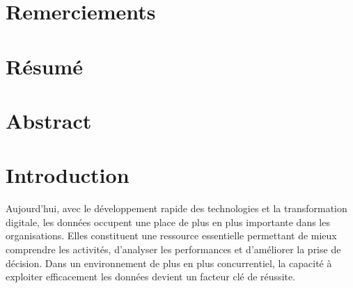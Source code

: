 \documentclass[12pt,a4paper]{report}
\begin{document}
	\newpage
	\thispagestyle{empty}
	\mbox{}
	\newpage
	
	\pagestyle{fancy}
	
	\chapter*{Remerciements}
	
	\vspace{1cm}
	
	
	\newpage
	
	\chapter*{Résumé}
	
	\vspace{1cm}
	
	
	\newpage
	
	\chapter*{Abstract}
	
	\vspace{1cm}
	
	
	\newpage
	
	\tableofcontents
	\newpage
	
	\listoffigures
	\newpage
	
\chapter*{Introduction}

Aujourd’hui, avec le développement rapide des technologies et la transformation digitale, les données occupent une place de plus en plus importante dans les organisations. Elles constituent une ressource essentielle permettant de mieux comprendre les activités, d’analyser les performances et d’améliorer la prise de décision. Dans un environnement de plus en plus concurrentiel, la capacité à exploiter efficacement les données devient un facteur clé de réussite.
\end{document}
